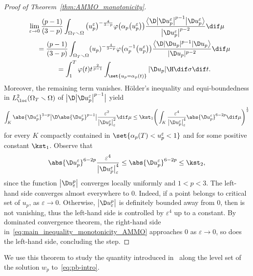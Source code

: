 \documentclass[10pt,a4paper]{amsart}
\numberwithin{equation}{section}
\begin{document}
\begin{proof}[Proof of Theorem~\ref{thm:AMMO_monotonicity}]
\begin{gather*}
 \lim_{\varepsilon \to 0}\frac{(p-1)}{(3-p)} \int_{\Omega_T \smallsetminus \Omega} \big(u^\varepsilon_p\big)^{-\frac{4}{3-p}}\varphi \big(\alpha_p\big(u^\varepsilon_p\big)\big) \frac{\big\langle\D \big| \D u^\varepsilon_p\big|^{p-1}\big|\D u^\varepsilon_p\big\rangle}{\big| \D u_p^\varepsilon\big|^{p-2} }\dif \mu\\
\qquad {} =\frac{(p-1)}{(3-p)} \int_{\Omega_T \smallsetminus \Omega} (u_p)^{-\frac{4}{3-p}}\varphi \big(\alpha_p^{-1}\big(u^\varepsilon_p\big)\big)\frac{\big\langle\D | \D u_p |^{p-1}|\D u_p\big\rangle}{| \D u_p |^{p-2} }\dif \mu\\
\qquad {} =\int_1^T\varphi(t)t^{\frac{2}{p-1}}\int_{\set{u_p=\alpha_p(t)}} |\D u_p | \H \dif \sigma \dif t.
\end{gather*}
Moreover, the remaining term vanishes. H\"older's inequality and equi-boundedness in $L_{\loc}^2(\Omega_T \smallsetminus \Omega)$ of $\big|\D \big|\D u^\varepsilon_p\big|^{p-1}\big|$ yield
\begin{equation}\label{eq:main_inequality_monotonicity_AMMO}
 \int_{K}\abs{\D u^\varepsilon_p}^{3-p}\big|\D \abs{ \D u^\varepsilon_p}^{p-1}\big|\frac{ \varepsilon^2}{\big| \D u^\varepsilon_p\big|_\varepsilon^2}\dif \mu\leq \kst_1\Bigg(\int_K\frac{\varepsilon^4}{\big| \D u^\varepsilon_p\big|_\varepsilon^4} \abs{\D u^\varepsilon_p}^{6-2p}\dif \mu\Bigg)^\frac{1}{2}
\end{equation}
for every $K$ compactly contained in $\set{ \alpha_p(T) < u_p^\varepsilon <1}$ and for some positive constant $\kst_1$. Observe that
\[
 \abs{\D u^\varepsilon_p}^{6-2p}\frac{\varepsilon^4}{\big| \D u^\varepsilon_p\big|_\varepsilon^4} \leq \abs{\D u^\varepsilon_p}^{6-2p}\leq \kst_2,
\]
since the function $\big| \D u_\varepsilon^p\big|$ converges locally uniformly and $1<p<3$. The left-hand side converges almost everywhere to $0$. Indeed, if a point belongs to critical set of $u_p$,  as $\varepsilon\to 0$. Otherwise, $\big| \D u_\varepsilon^p\big|$ is definitely bounded away from $0$, then  is not vanishing, thus the left-hand side is controlled by $\varepsilon^4$ up to a constant. By dominated convergence theorem, the right-hand side in~\eqref{eq:main_inequality_monotonicity_AMMO} approaches $0$ as $\varepsilon \to 0$, so does the left-hand side, concluding the step. \end{proof}

We use this theorem to study the quantity introduced in~\cite[Theorem 1.2]{chan_monotonicitygreenfunctions_2022} along the level set of the solution $w_p$ to~\eqref{eq:pb-intro}.
\end{document}
